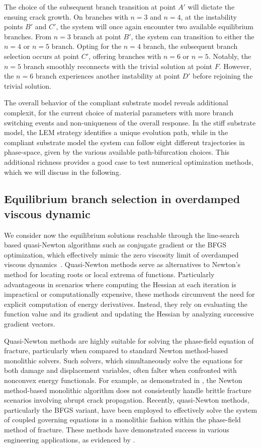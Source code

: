 The choice of the subsequent branch transition at point $A'$ will dictate the ensuing crack growth. On branches with $n=3$ and $n=4$, at the instability points $B'$ and $C'$, the system will once again encounter two available equilibrium branches. From $n=3$ branch  at point $B'$, the system can transition to either the $n=4$ or $n=5$ branch. Opting for the $n=4$ branch, the subsequent branch selection occurs at point $C'$, offering branches with $n=6$ or $n=5$. Notably, the $n=5$ branch smoothly reconnects with the trivial solution at point $F$. However, the $n=6$ branch experiences another instability at point $D'$ before rejoining the trivial solution. 

The overall behavior of the compliant substrate model reveals additional complexit, for the current choice of material parameters with more branch switching events and non-uniqueness of the overall response. In the stiff substrate model, the LEM strategy identifies a unique evolution path, while in the compliant substrate model the system can follow eight different trajectories in phase-space, given by the various available path-bifurcation choices. This additional richness provides a good case to test numerical optimization methods, which we will discuss in the following.

\subsection{Equilibrium branch selection in overdamped viscous dynamic}
We consider now the equilibrium solutions reachable through the line-search based quasi-Newton algorithms such as  conjugate gradient or the BFGS optimization, which effectively  mimic the zero viscosity limit of overdamped viscous dynamics~\cite{SALMAN2012219}. Quasi-Newton methods serve as alternatives to Newton's method for locating roots or local extrema of functions. Particularly advantageous in scenarios where computing the Hessian at each iteration is impractical or computationally expensive, these methods circumvent the need for explicit computation of energy derivatives. Instead, they rely on evaluating the function value and its gradient and updating the Hessian by analyzing successive gradient vectors.

Quasi-Newton methods are highly suitable for solving the phase-field equation of fracture, particularly when compared to standard Newton method-based monolithic solvers. Such solvers, which simultaneously  solve the equations for both damage and displacement variables, often falter when confronted with nonconvex energy functionals. For example, as demonstrated in \cite{Wick2017-bo}, the Newton method-based monolithic algorithm does not consistently handle brittle fracture scenarios involving abrupt crack propagation. Recently, quasi-Newton methods, particularly the BFGS variant, have been employed to effectively solve the system of coupled governing equations in a monolithic fashion within the phase-field method of fracture. These methods have demonstrated success in various engineering applications, as evidenced by \cite{Kristensen2020-zy,Wu2020-qk,Salman2021-mn,Liu2022-ix}.

